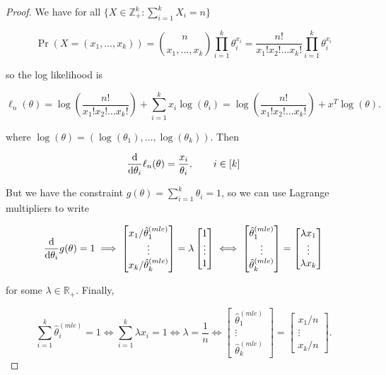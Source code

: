  \begin{proof} We have for all \(\{X \in \mathbb{Z}_+^k: \sum_{i=1}^k X_i = n\}\)

\[
\Pr(X = (x_1, \ldots, x_k) ) = \binom{n}{x_1, \ldots,  x_k} \prod_{i=1}^k \theta_i^{x_i} = \frac{n!}{x_1! x_2! \ldots x_k!}\prod_{i=1}^k \theta_i^{x_i} 
\] 

so the log likelihood is 

\[
\ell_n(\theta) = \log \left( \frac{n!}{x_1! x_2! \ldots x_k!}\right)  + \sum_{i=1}^k x_i \log(\theta_i) = \log \left( \frac{n!}{x_1! x_2! \ldots x_k!}\right)  + x^T \log(\theta).
\]

where \(\log(\theta) = (\log(\theta_1), \ldots, \log(\theta_k))\). Then

\[
\frac{\mathrm{d} }{\mathrm{d} \theta_i} \ell_n(\theta) =  \frac{x_i}{\theta_i}, \qquad i \in [k]
\]


But we have the constraint \(g(\theta) = \sum_{i=1}^k \theta_i = 1\), so we can use Lagrange multipliers to write

\[
\frac{\mathrm{d} }{\mathrm{d} \theta_i}  g(\theta) = 1 \implies \begin{bmatrix}  
x_1 / \hat{\theta}_1^{(mle)} \\
\vdots \\
x_k / \hat{\theta}_k^{(mle)}
\end{bmatrix} = \lambda  \begin{bmatrix}  
1 \\
\vdots \\
1
\end{bmatrix} \iff \begin{bmatrix}
 \hat{\theta}_1^{(mle)}  \\
 \vdots \\
  \hat{\theta}_k^{(mle)} 
  \end{bmatrix} = \begin{bmatrix}
  \lambda x_1 \\
  \vdots \\
  \lambda x_k
  \end{bmatrix}
\]

for some \(\lambda \in \mathbb{R}_+\). Finally, 

\[
\sum_{i=1}^k \hat{\theta}_i^{(mle)} = 1 \iff \sum_{i=1}^k \lambda x_i = 1 \iff \lambda = \frac{1}{n} \iff  \begin{bmatrix}
 \hat{\theta}_1^{(mle)}  \\
 \vdots \\
  \hat{\theta}_k^{(mle)} 
  \end{bmatrix} = \begin{bmatrix}
x_1/n \\
  \vdots \\
 x_k/n
  \end{bmatrix}.
\]

\end{proof}

